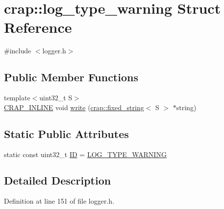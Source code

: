 \hypertarget{structcrap_1_1log__type__warning}{\section{crap\+:\+:log\+\_\+type\+\_\+warning Struct Reference}
\label{structcrap_1_1log__type__warning}
}


{\ttfamily \#include $<$logger.\+h$>$}

\subsection*{Public Member Functions}
\begin{DoxyCompactItemize}
\item 
{\footnotesize template$<$uint32\+\_\+t S$>$ }\\\hyperlink{config__x86_8h_a5a40526b8d842e7ff731509998bb0f1c}{C\+R\+A\+P\+\_\+\+I\+N\+L\+I\+N\+E} void \hyperlink{structcrap_1_1log__type__warning_a1b523db5b36965a4834d94290edcdd78}{write} (\hyperlink{classcrap_1_1fixed__string}{crap\+::fixed\+\_\+string}$<$ S $>$ $\ast$string)
\end{DoxyCompactItemize}
\subsection*{Static Public Attributes}
\begin{DoxyCompactItemize}
\item 
static const uint32\+\_\+t \hyperlink{structcrap_1_1log__type__warning_ac810aca14e350fa909e401239bd9e829}{I\+D} = \hyperlink{logger_8h_a5781a92890ba75559c17d6c7f613ab29}{L\+O\+G\+\_\+\+T\+Y\+P\+E\+\_\+\+W\+A\+R\+N\+I\+N\+G}
\end{DoxyCompactItemize}


\subsection{Detailed Description}


Definition at line 151 of file logger.\+h.



